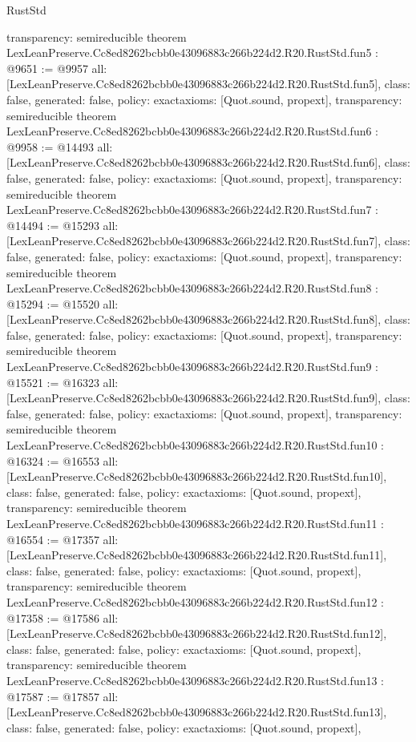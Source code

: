 \begin{lexlean}{RustStd}
\begin{coremodule}
{  transparency: semireducible
}
theorem LexLeanPreserve.Cc8ed8262bcbb0e43096883c266b224d2.R20.RustStd.fun5 : @9651 := @9957 {
  all: [LexLeanPreserve.Cc8ed8262bcbb0e43096883c266b224d2.R20.RustStd.fun5],
  class: false,
  generated: false,
  policy: exact{axioms: [Quot.sound, propext]},
  transparency: semireducible
}
theorem LexLeanPreserve.Cc8ed8262bcbb0e43096883c266b224d2.R20.RustStd.fun6 : @9958 := @14493 {
  all: [LexLeanPreserve.Cc8ed8262bcbb0e43096883c266b224d2.R20.RustStd.fun6],
  class: false,
  generated: false,
  policy: exact{axioms: [Quot.sound, propext]},
  transparency: semireducible
}
theorem LexLeanPreserve.Cc8ed8262bcbb0e43096883c266b224d2.R20.RustStd.fun7 : @14494 := @15293 {
  all: [LexLeanPreserve.Cc8ed8262bcbb0e43096883c266b224d2.R20.RustStd.fun7],
  class: false,
  generated: false,
  policy: exact{axioms: [Quot.sound, propext]},
  transparency: semireducible
}
theorem LexLeanPreserve.Cc8ed8262bcbb0e43096883c266b224d2.R20.RustStd.fun8 : @15294 := @15520 {
  all: [LexLeanPreserve.Cc8ed8262bcbb0e43096883c266b224d2.R20.RustStd.fun8],
  class: false,
  generated: false,
  policy: exact{axioms: [Quot.sound, propext]},
  transparency: semireducible
}
theorem LexLeanPreserve.Cc8ed8262bcbb0e43096883c266b224d2.R20.RustStd.fun9 : @15521 := @16323 {
  all: [LexLeanPreserve.Cc8ed8262bcbb0e43096883c266b224d2.R20.RustStd.fun9],
  class: false,
  generated: false,
  policy: exact{axioms: [Quot.sound, propext]},
  transparency: semireducible
}
theorem LexLeanPreserve.Cc8ed8262bcbb0e43096883c266b224d2.R20.RustStd.fun10 : @16324 := @16553 {
  all: [LexLeanPreserve.Cc8ed8262bcbb0e43096883c266b224d2.R20.RustStd.fun10],
  class: false,
  generated: false,
  policy: exact{axioms: [Quot.sound, propext]},
  transparency: semireducible
}
theorem LexLeanPreserve.Cc8ed8262bcbb0e43096883c266b224d2.R20.RustStd.fun11 : @16554 := @17357 {
  all: [LexLeanPreserve.Cc8ed8262bcbb0e43096883c266b224d2.R20.RustStd.fun11],
  class: false,
  generated: false,
  policy: exact{axioms: [Quot.sound, propext]},
  transparency: semireducible
}
theorem LexLeanPreserve.Cc8ed8262bcbb0e43096883c266b224d2.R20.RustStd.fun12 : @17358 := @17586 {
  all: [LexLeanPreserve.Cc8ed8262bcbb0e43096883c266b224d2.R20.RustStd.fun12],
  class: false,
  generated: false,
  policy: exact{axioms: [Quot.sound, propext]},
  transparency: semireducible
}
theorem LexLeanPreserve.Cc8ed8262bcbb0e43096883c266b224d2.R20.RustStd.fun13 : @17587 := @17857 {
  all: [LexLeanPreserve.Cc8ed8262bcbb0e43096883c266b224d2.R20.RustStd.fun13],
  class: false,
  generated: false,
  policy: exact{axioms: [Quot.sound, propext]},
}
\end{coremodule}
\end{lexlean}
